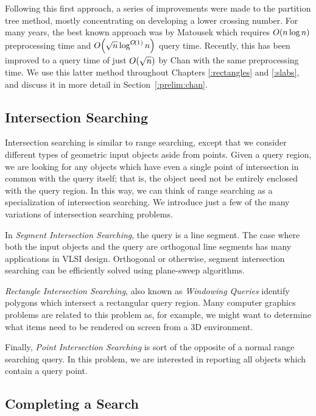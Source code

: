 Following this first approach, a series of improvements were made to the partition tree method, mostly concentrating on developing a lower crossing number.
For many years, the best known approach was by Matousek\cite{Matousek92} which requires $O\!\left(n\log{n}\right)$ preprocessing time and $O\!\left(\sqrt{n}\log^{O\!\left(1\right)}{n}\right)$ query time.
Recently, this has been improved to a query time of just $O\!\left(\sqrt{n}\right)$ by Chan\cite{chan2012} with the same preprocessing time.
We use this latter method throughout Chapters \ref{:rectangles} and \ref{:slabs}, and discuss it in more detail in Section~\ref{:prelim:chan}.


\subsection*{Intersection Searching} 

Intersection searching is similar to range searching, except that we consider different types of geometric input objects aside from points.
Given a query region, we are looking for any objects which have even a single point of intersection in common with the query itself; that is, the object need not be entirely enclosed with the query region.
In this way, we can think of range searching as a specialization of intersection searching.
We introduce just a few of the many variations of intersection searching problems.

In \emph{Segment Intersection Searching}, the query is a line segment. 
The case where both the input objects and the query are orthogonal line segments has many applications in VLSI design.
Orthogonal or otherwise, segment intersection searching can be efficiently solved using plane-sweep algorithms.

\emph{Rectangle Intersection Searching}, also known as \emph{Windowing Queries} identify polygons which intersect a rectangular query region. 
Many computer graphics problems are related to this problem as, for example, we might want to determine what items need to be rendered on screen from a 3D environment.

Finally, \emph{Point Intersection Searching} is sort of the opposite of a normal range searching query. In this problem, we are interested in reporting all objects which contain a query point.


\subsection*{Completing a Search}

